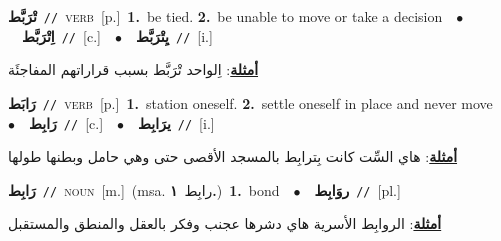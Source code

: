 \documentclass[10pt,a4paper,twoside]{article} %
\begin{document}
\begin{multicols}{2}
{\setlength\topsep{0pt}\textbf{\foreignlanguage{arabic}{تْرَبَّط}}\ {\color{gray}\texttt{//}\color{black}}\ \textsc{verb}\ [p.]\ \textbf{1.}~be tied.  \textbf{2.}~be unable to move or take a decision\ \ $\bullet$\ \ \setlength\topsep{0pt}\textbf{\foreignlanguage{arabic}{اِتْرَبَّط}}\ {\color{gray}\texttt{//}\color{black}}\ [c.]\ \ $\bullet$\ \ \setlength\topsep{0pt}\textbf{\foreignlanguage{arabic}{يِتْرَبَّط}}\ {\color{gray}\texttt{//}\color{black}}\ [i.]\  \begin{flushright}\color{gray}\foreignlanguage{arabic}{\textbf{\underline{\foreignlanguage{arabic}{أمثلة}}}: اِلواحد تْرَبَّط بسبب قراراتهم المفاجئَة}\end{flushright}\color{black}} \vspace{2mm}

{\setlength\topsep{0pt}\textbf{\foreignlanguage{arabic}{رَابَط}}\ {\color{gray}\texttt{//}\color{black}}\ \textsc{verb}\ [p.]\ \textbf{1.}~station oneself.  \textbf{2.}~settle oneself in place and never move\ \ $\bullet$\ \ \setlength\topsep{0pt}\textbf{\foreignlanguage{arabic}{رَابِط}}\ {\color{gray}\texttt{//}\color{black}}\ [c.]\ \ $\bullet$\ \ \setlength\topsep{0pt}\textbf{\foreignlanguage{arabic}{يرَابِط}}\ {\color{gray}\texttt{//}\color{black}}\ [i.]\  \begin{flushright}\color{gray}\foreignlanguage{arabic}{\textbf{\underline{\foreignlanguage{arabic}{أمثلة}}}: هاي السِّت كانت بِترابِط بالمسجد الأقصى حتى وهي حامل وبطنها طولها}\end{flushright}\color{black}} \vspace{2mm}

{\setlength\topsep{0pt}\textbf{\foreignlanguage{arabic}{رَابِط}}\ {\color{gray}\texttt{//}\color{black}}\ \textsc{noun}\ [m.]\ \color{gray}(msa. \foreignlanguage{arabic}{رابِط}~\foreignlanguage{arabic}{\textbf{١.}})\color{black}\ \textbf{1.}~bond\ \ $\bullet$\ \ \setlength\topsep{0pt}\textbf{\foreignlanguage{arabic}{روَابِط}}\ {\color{gray}\texttt{//}\color{black}}\ [pl.]\  \begin{flushright}\color{gray}\foreignlanguage{arabic}{\textbf{\underline{\foreignlanguage{arabic}{أمثلة}}}: الروابِط الأسرية هاي دشرها عجنب وفكر بالعقل والمنطق والمستقبل}\end{flushright}\color{black}} \vspace{2mm}


\end{multicols}
\end{document}
